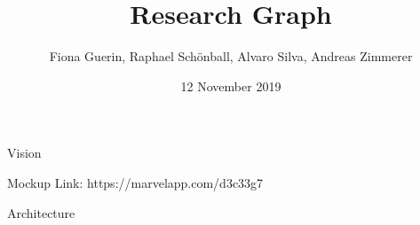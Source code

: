 \documentclass{beamer}
\title[Research Graph]{Research Graph}
\author[Guerin, Schönball, Silva, Zimmerer]{Fiona Guerin, Raphael Schönball, Alvaro Silva, Andreas Zimmerer}
\institute{Technical University of Munich}
\date{12 November 2019}
\begin{document}
\maketitle

\begin{frame}{Vision}
\end{frame}

\begin{frame}{Mockup}
	Link: https://marvelapp.com/d3c33g7
\end{frame}

\begin{frame}{Architecture}
\end{frame}
\end{document}
